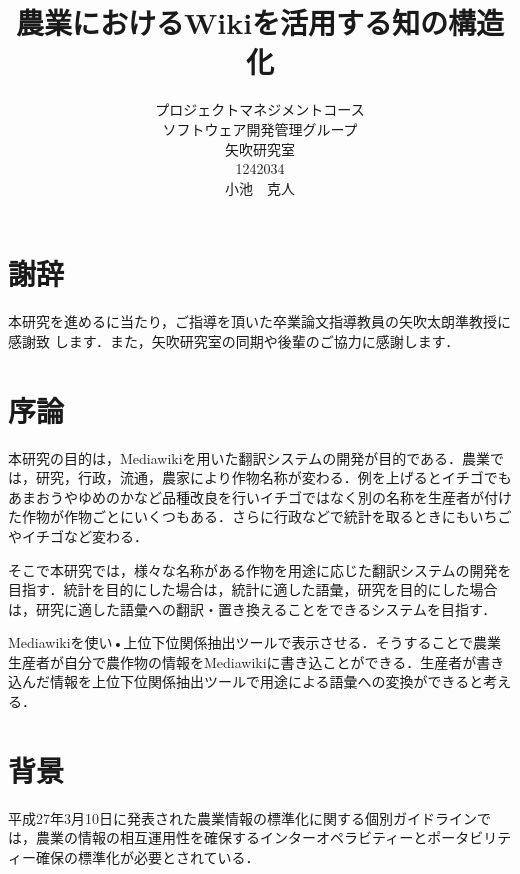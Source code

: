 \title{農業におけるWikiを活用する知の構造化}
\author{プロジェクトマネジメントコース\\
ソフトウェア開発管理グループ\\
矢吹研究室\\
1242034\\
小池　克人}
\date{}

\maketitle



 \chapter*{謝辞}
本研究を進めるに当たり，ご指導を頂いた卒業論文指導教員の矢吹太朗準教授に感謝致 します．また，矢吹研究室の同期や後輩のご協力に感謝します．
\tableofcontents%

 \chapter{序論}
本研究の目的は，Mediawikiを用いた翻訳システムの開発が目的である．農業では，研究，行政，流通，農家により作物名称が変わる．例を上げるとイチゴでもあまおうやゆめのかなど品種改良を行いイチゴではなく別の名称を生産者が付けた作物が作物ごとにいくつもある．さらに行政などで統計を取るときにもいちごやイチゴなど変わる．

そこで本研究では，様々な名称がある作物を用途に応じた翻訳システムの開発を目指す．統計を目的にした場合は，統計に適した語彙，研究を目的にした場合は，研究に適した語彙への翻訳・置き換えることをできるシステムを目指す．

Mediawikiを使い•上位下位関係抽出ツールで表示させる．そうすることで農業生産者が自分で農作物の情報をMediawikiに書き込ことができる．生産者が書き込んだ情報を上位下位関係抽出ツールで用途による語彙への変換ができると考える．


 \chapter{背景}
平成27年3月10日に発表された農業情報の標準化に関する個別ガイドラインでは，農業の情報の相互運用性を確保するインターオペラビティーとポータビリティー確保の標準化が必要とされている\cite{naikaku2014}．

